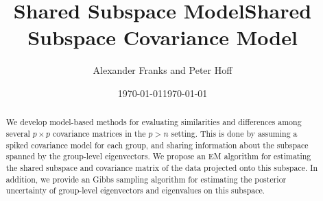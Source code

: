 \documentclass{article}
\begin{document}
\title{Shared Subspace Model}


\date{\today}


\title{Shared Subspace Covariance Model}
\author{Alexander Franks and Peter Hoff}
\date{\today}
\maketitle 



\begin{abstract}
  We develop model-based methods for evaluating similarities and
  differences among several $p\times p$ covariance matrices in the
  $p>n$ setting.  This is done by assuming a spiked covariance model
  for each group, and sharing information about the subspace spanned
  by the group-level eigenvectors.  We propose an EM algorithm for
  estimating the shared subspace and covariance matrix of the data
  projected onto this subspace.  In addition, we provide an Gibbs
  sampling algorithm for estimating the posterior uncertainty of
  group-level eigenvectors and eigenvalues on this subspace.

\end{abstract}


\end{document}
